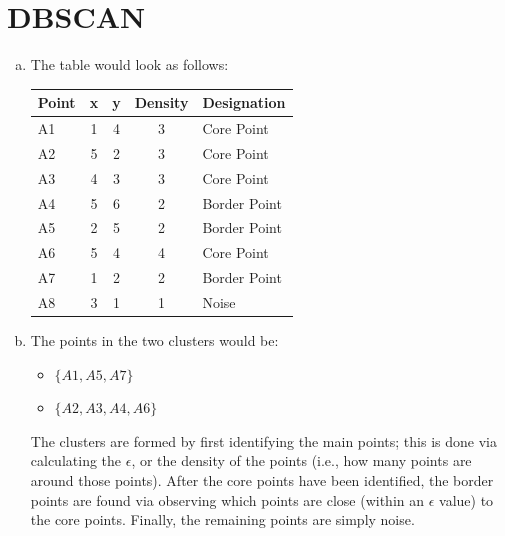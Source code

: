 \documentclass[12pt]{scrartcl}
\begin{document}
\maketitle

\section{DBSCAN}
\begin{enumerate}[a)]
    \item The table would look as follows:

        \begin{table}[H]
            \centering
            \begin{tabular}{|l|c|c|c|l|}
                \hline
                \textbf{Point} & \textbf{x} & \textbf{y} & \textbf{Density} & \textbf{Designation} \\\hline
                A1 & 1 & 4 & 3 & Core Point \\
                A2 & 5 & 2 & 3 & Core Point \\
                A3 & 4 & 3 & 3 & Core Point \\
                A4 & 5 & 6 & 2 & Border Point \\
                A5 & 2 & 5 & 2 & Border Point \\
                A6 & 5 & 4 & 4 & Core Point \\
                A7 & 1 & 2 & 2 & Border Point \\
                A8 & 3 & 1 & 1 & Noise \\\hline
            \end{tabular}
        \end{table}

    \item The points in the two clusters would be:

        \begin{itemize}
            \item $\{ A1, A5, A7 \}$
            \item $\{ A2, A3, A4, A6 \}$
        \end{itemize}

        The clusters are formed by first identifying the main points; this is done via calculating the $\epsilon$, or the density of the points (i.e., how many points are around those points). After the core points have been identified, the border points are found via observing which points are close (within an $\epsilon$ value) to the core points. Finally, the remaining points are simply noise.
\end{enumerate}
\end{document}
